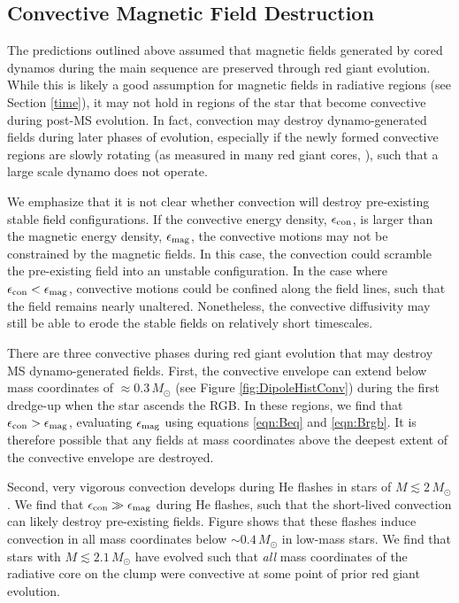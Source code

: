 \subsection{Convective Magnetic Field Destruction}

The predictions outlined above assumed that magnetic fields generated by cored dynamos during the main sequence are preserved through red giant evolution. While this is likely a good assumption for magnetic fields in radiative regions (see Section \ref{time}), it may not hold in regions of the star that become convective during post-MS evolution. In fact, convection may destroy dynamo-generated fields during later phases of evolution, especially if the newly formed convective regions are slowly rotating (as measured in many red giant cores, \cite{Mosser_2012}), such that a large scale dynamo does not operate.

We emphasize that it is not clear whether convection will destroy pre-existing stable field configurations. If the convective energy density, $\epsilon_{\rm con}$, is larger than the magnetic energy density, $\epsilon_{\rm mag}$, the convective motions may not be constrained by the magnetic fields. In this case, the convection could scramble the pre-existing field into an unstable configuration. In the case where $\epsilon_{\rm con} < \epsilon_{\rm mag}$, convective motions could be confined along the field lines, such that the field remains nearly unaltered. Nonetheless, the convective diffusivity may still be able to erode the stable fields on relatively short timescales.

There are three convective phases during red giant evolution that may destroy MS dynamo-generated fields. First, the convective envelope can extend below mass coordinates of $\approx 0.3 \, M_\odot$ (see Figure \ref{fig:DipoleHistConv}) during the first dredge-up when the star ascends the RGB. In these regions, we find that $\epsilon_{\rm con} > \epsilon_{\rm mag}$, evaluating $\epsilon_{\rm mag}$ using equations \ref{eqn:Beq} and \ref{eqn:Brgb}. It is therefore possible that any fields at mass coordinates above the deepest extent of the convective envelope are destroyed.

Second, very vigorous convection develops during He flashes in stars of $M \lesssim 2 \, M_\odot$. We find that $\epsilon_{\rm con} \gg \epsilon_{\rm mag}$ during He flashes, such that the short-lived convection can likely destroy pre-existing fields. Figure \label{fig:DipoleHistConv} shows that these flashes induce convection in all mass coordinates below $ \sim \! 0.4 \, M_\odot$ in low-mass stars. We find that stars with $M \lesssim 2.1 \, M_\odot$ have evolved such that {\it all} mass coordinates  of the radiative core on the clump were convective at some point of prior red giant evolution. 

